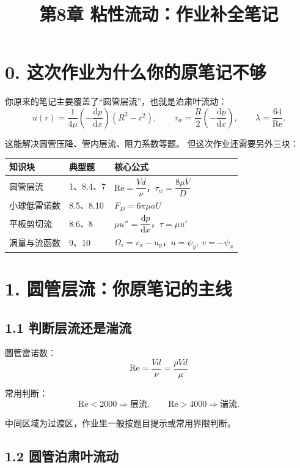 ﻿\documentclass[12pt,a4paper]{ctexart}
\title{第8章 粘性流动：作业补全笔记}
\author{}
\date{}
\newcommand{\dd}{\mathrm d}
\newcommand{\Rey}{\mathrm{Re}}
\begin{document}
\maketitle

\section*{0. 这次作业为什么你的原笔记不够}

你原来的笔记主要覆盖了“圆管层流”，也就是泊肃叶流动：
\[
u(r)=\frac{1}{4\mu}\left(-\frac{\dd p}{\dd x}\right)(R^2-r^2),
\qquad
\tau_w=\frac{R}{2}\left(-\frac{\dd p}{\dd x}\right),
\qquad
\lambda=\frac{64}{\Rey}.
\]

这能解决圆管压降、管内层流、阻力系数等题。
但这次作业还需要另外三块：

\begin{center}
\begin{tabular}{lll}
\toprule
知识块 & 典型题 & 核心公式 \\
\midrule
圆管层流 & 1、8.4、7 & \(\Rey=\dfrac{Vd}{\nu}\)，\(\tau_w=\dfrac{8\mu \bar V}{D}\) \\
小球低雷诺数 & 8.5、8.10 & \(F_D=6\pi\mu aU\) \\
平板剪切流 & 8.6、8 & \(\mu u''=\dfrac{\dd p}{\dd x}\)，\(\tau=\mu u'\) \\
涡量与流函数 & 9、10 & \(\Omega_z=v_x-u_y\)，\(u=\psi_y,\ v=-\psi_x\) \\
\bottomrule
\end{tabular}
\end{center}

\section*{1. 圆管层流：你原笔记的主线}

\subsection*{1.1 判断层流还是湍流}

圆管雷诺数：
\[
\boxed{
\Rey=\frac{Vd}{\nu}=\frac{\rho Vd}{\mu}
}
\]

常用判断：
\[
\Rey<2000\Rightarrow \text{层流},
\qquad
\Rey>4000\Rightarrow \text{湍流}.
\]

中间区域为过渡区，作业里一般按题目提示或常用界限判断。

\subsection*{1.2 圆管泊肃叶流动}
\end{document}

